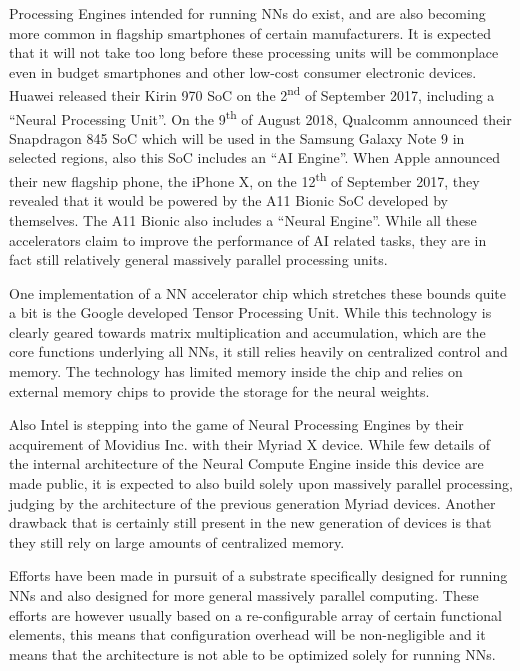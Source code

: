  Processing Engines intended for running \acp{NN} do exist, and are also becoming more common in flagship smartphones of certain manufacturers. It is expected that it will not take too long before these processing units will be commonplace even in budget smartphones and other low-cost consumer electronic devices. Huawei released their Kirin 970 \ac{SoC} on the 2\textsuperscript{nd} of September 2017\cite{huawei}, including a ``Neural Processing Unit''. On the 9\textsuperscript{th} of August 2018, Qualcomm announced their Snapdragon 845 \ac{SoC} which will be used in the Samsung Galaxy Note 9 in selected regions\cite{qualcomm}, also this \ac{SoC} includes an ``AI Engine''. When Apple announced their new flagship phone, the iPhone X, on the 12\textsuperscript{th} of September 2017, they revealed that it would be powered by the A11 Bionic \ac{SoC} developed by themselves\cite{apple}. The A11 Bionic also includes a ``Neural Engine''. While all these accelerators claim to improve the performance of \ac{AI} related tasks, they are in fact still relatively general massively parallel processing units\cite{techtarget}.

One implementation of a \ac{NN} accelerator chip which stretches these bounds quite a bit is the Google developed Tensor Processing Unit\cite{8192463,techtarget}. While this technology is clearly geared towards matrix multiplication and accumulation, which are the core functions underlying all \acp{NN}, it still relies heavily on centralized control and memory. The technology has limited memory inside the chip and relies on external memory chips to provide the storage for the neural weights.

Also Intel is stepping into the game of Neural Processing Engines by their acquirement of Movidius Inc. with their Myriad X device\cite{movidius2}. While few details of the internal architecture of the Neural Compute Engine inside this device are made public, it is expected to also build solely upon massively parallel processing, judging by the architecture of the previous generation Myriad devices\cite{movidius1}. Another drawback that is certainly still present in the new generation of devices is that they still rely on large amounts of centralized memory.

Efforts have been made in pursuit of a substrate specifically designed for running \acp{NN}\cite{1693534} and also designed for more general massively parallel computing\cite{7818353}. These efforts are however usually based on a re-configurable array of certain functional elements, this means that configuration overhead will be non-negligible and it means that the architecture is not able to be optimized solely for running \acp{NN}.

